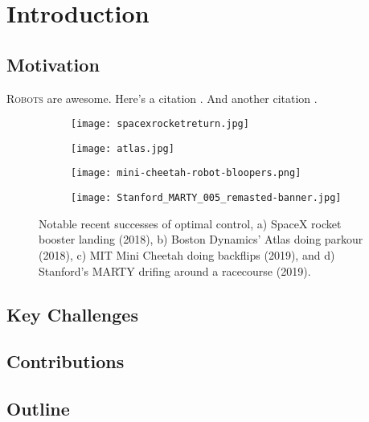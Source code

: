 \documentclass[../thesis.tex]{subfiles}
\begin{document}
\chapter{Introduction}
\section{Motivation}
\lettrine{R}{obots} are awesome. \blindtext
Here's a citation \cite{jackson_ALTROC_2021a}. \blindtext And another 
citation \cite{jacksonPerformanceDynamicallySimulated2016}.

\begin{figure}[t]
    \centering
    \begin{subfigure}[b]{0.24\columnwidth}
        \texttt{[image: spacexrocketreturn.jpg]} 
        \caption{}
    \end{subfigure}
    \begin{subfigure}[b]{0.24\columnwidth}
        \texttt{[image: atlas.jpg]} 
        \caption{}
    \end{subfigure}
    \begin{subfigure}[b]{0.24\columnwidth}
        \texttt{[image: mini-cheetah-robot-bloopers.png]} 
        \caption{}
    \end{subfigure}
    \begin{subfigure}[b]{0.24\columnwidth}
        \texttt{[image: Stanford\_MARTY\_005\_remasted-banner.jpg]} 
        \caption{}
    \end{subfigure}
    \caption{Notable recent successes of optimal control, a) SpaceX rocket booster landing (2018), b) Boston Dynamics' Atlas doing parkour (2018), c) MIT Mini Cheetah doing backflips (2019), and d) Stanford's MARTY drifing around a racecourse (2019).}
    \label{fig:applications}
\end{figure}

\blindtext[3]


\section{Key Challenges} 

\blindtext

\section{Contributions}

\blinditemize

\section{Outline}

\blindtext[3]
\end{document}
